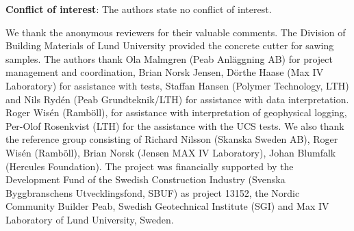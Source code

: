 \documentclass[USenglish,twocolumn]{article}
\begin{document}
\noindent
\textbf{Conflict of interest}: The authors state no conflict of interest.

\begin{acknowledgement}
We thank the anonymous reviewers for their valuable comments. The Division of Building Materials of Lund University provided the concrete cutter for sawing samples. The authors thank Ola Malmgren (Peab Anläggning AB) for project management and coordination, Brian Norsk Jensen, Dörthe Haase (Max IV Laboratory) for assistance with tests, Staffan Hansen (Polymer Technology, LTH) and Nils Rydén (Peab Grundteknik/LTH) for assistance with data interpretation. Roger Wisén (Ramböll), for assistance with interpretation of geophysical logging, Per-Olof Rosenkvist (LTH) for the assistance with the UCS tests. We also thank the reference group consisting of Richard Nilsson (Skanska Sweden AB), Roger Wisén (Ramböll), Brian Norsk (Jensen MAX IV Laboratory), Johan Blumfalk (Hercules Foundation). The project was financially supported by the Development Fund of the Swedish Construction Industry (Svenska Byggbranschens Utvecklingsfond, SBUF) as project 13152, the Nordic Community Builder Peab, Swedish Geotechnical Institute (SGI) and Max IV Laboratory of Lund University, Sweden. 
\end{acknowledgement}

%
%


\end{document}
